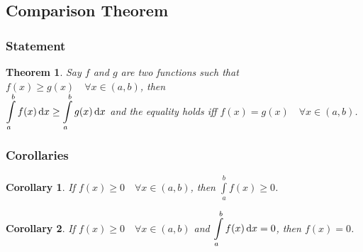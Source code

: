 \documentclass[14]{article}
\newtheorem{theorem}{Theorem}
\newtheorem{corollary}{Corollary}
\theoremstyle{definition}
\theoremstyle{case}
\begin{document}
\subsection{Comparison Theorem}
\subsubsection{Statement}
\begin{theorem}
Say $f$ and $g$ are two functions such that $f(x) \geq g(x) \quad \forall x \in (a, b)$, then\\ $\displaystyle \int\limits_a^b f(x) \dif x \geq \int\limits_a^b g(x) \dif x$ and the equality holds iff $f(x) = g(x) \quad \forall x \in (a, b)$.
\end{theorem}
\subsubsection{Corollaries}
\begin{corollary}
If $f(x) \geq 0 \quad \forall x \in (a, b)$, then $\displaystyle\int\limits_a^b f(x) \geq 0$.
\end{corollary}
\begin{corollary}
If $f(x) \geq 0 \quad \forall x \in (a, b)$ and $\displaystyle\int\limits_a^b f(x) \dif x = 0$, then $f(x) = 0$.
\end{corollary}
\end{document}
